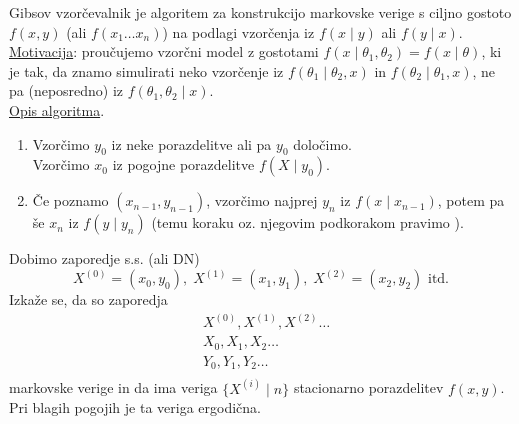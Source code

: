 \documentclass[a4paper, 12pt]{book}
\theoremstyle{definition}
\theoremstyle{remark}
\begin{document}
Gibsov vzorčevalnik je algoritem za konstrukcijo markovske verige s ciljno gostoto $f(x,y)$ (ali $f(x_1 \dots x_n)$)
na podlagi vzorčenja iz  $f(x \mid y)$ ali $f(y \mid x)$. \\
\underline{Motivacija}: proučujemo vzorčni model z gostotami $f(x \mid \theta_1, \theta_2) = f(x \mid \theta)$,
ki je tak, da znamo simulirati neko vzorčenje iz $f(\theta_1 \mid \theta_2, x)$ in $f(\theta_2 \mid \theta_1, x)$,
ne pa (neposredno) iz $f(\theta_1, \theta_2 \mid x)$. \\
\underline{Opis algoritma}.
\begin{enumerate}[label=(\roman*)]
  \item Vzorčimo $y_0$ iz neke porazdelitve ali pa $y_0$ določimo. \\
    Vzorčimo $x_0$ iz pogojne porazdelitve $f(X \mid y_0)$.
  \item Če poznamo $(x_{n-1}, y_{n-1})$, vzorčimo najprej $y_n$ iz $f(x \mid x_{n-1})$,
    potem pa še $x_n$ iz $f(y \mid y_n)$ (temu koraku oz. njegovim podkorakom pravimo ).
\end{enumerate}
Dobimo zaporedje s.s. (ali DN)
\begin{equation*}
  X^{(0)} = (x_0, y_0), \; X^{(1)} = (x_1, y_1), \; X^{(2)} = (x_2, y_2) \text{ itd.}
\end{equation*}
Izkaže se, da so zaporedja
\begin{align*}
  &X^{(0)}, X^{(1)}, X^{(2)} \dots \\
  &X_0, X_1, X_2 \dots \\
  &Y_0, Y_1, Y_2 \dots \\
\end{align*}
markovske verige in da ima veriga $\{X^{(i)} \mid n\}$ stacionarno porazdelitev $f(x,y)$.
Pri blagih pogojih je ta veriga ergodična.
\end{document}
